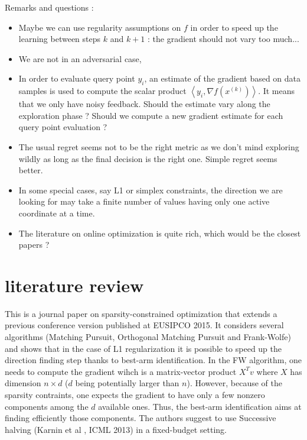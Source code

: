\documentclass[english]{article}
\begin{document}
Remarks and questions : 
\begin{itemize}
	\item Maybe we can use regularity assumptions on $f$ in order to speed up 
	the learning between steps $k$ and $k+1$ : the gradient should not vary too 
	much...
	\item We are not in an adversarial case,
	\item In order to evaluate query point $y_i$, an estimate of the gradient 
	based on data samples is used to compute the scalar product $\left\langle 
	y_i,\nabla f(x^{(k)})\right\rangle$. It means that we only have noisy 
	feedback. Should the estimate vary along the exploration phase ? Should we 
	compute a new gradient estimate for each query point evaluation ? 
	\item The usual regret seems not to be the right metric as we don't mind 
	exploring wildly as long as the final decision is the right one. Simple 
	regret seems better. 
	\item In some special cases, say L1 or simplex constraints, the direction 
	we are looking for may take a finite number of values having only one 
	active coordinate at a time. 
	\item The literature on online optimization is quite rich, which would be 
	the closest papers ? 
\end{itemize}

\section{literature review}


This is a journal paper on sparsity-constrained optimization that extends a previous conference version published at EUSIPCO 2015. It considers several algorithms (Matching Pursuit, Orthogonal Matching Pursuit and Frank-Wolfe) and shows that in the case of L1 regularization it is possible to speed up the direction finding step thanks to best-arm identification. In the FW algorithm, one needs to compute the gradient wihch is a matrix-vector product $X^T v$ where $X$ has dimension $n \times d$ ($d$ being potentially larger than $n$). However, because of the sparsity contraints, one expects the gradient to have only a few nonzero components among the $d$ available ones. Thus, the best-arm identification aims at finding efficiently those components. The authors suggest to use Successive halving (Karnin et al , ICML 2013) in a fixed-budget setting.
\end{document}
